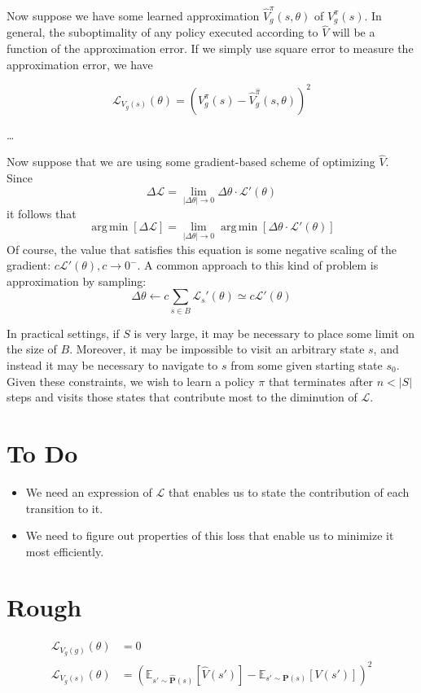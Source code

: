 \documentclass{article}
\DeclareMathOperator*{\argmin}{arg\,min}
\begin{document}
Now suppose we have some learned approximation $\hat{V}_{g}^\pi(s, \theta)$ of $V_{g}^\pi(s)$. In general, the suboptimality of any policy executed according to $\hat{V}$ will be a function of the approximation error. If we simply use square error to measure the approximation error, we have

\[
   \mathcal{L}_{V_g(s)}(\theta) = {({V_g^\pi(s) - \hat{V}_{g}^{\hat{\pi}}(s, \theta)})}^2
\]

\ldots 
\vspace{5mm}

Now suppose that we are using some gradient-based scheme of optimizing $\hat{V}$. Since 
\[
  \Delta \mathcal{L} = \lim_{|\Delta \theta| \to 0}\Delta \theta \cdot \mathcal{L}'(\theta)
\]
it follows that
\[
  \argmin \left[ \Delta \mathcal{L} \right] = \lim_{|\Delta \theta| \to 0}\argmin \left[ \Delta \theta \cdot \mathcal{L}'(\theta) \right]
\]
Of course, the value that satisfies this equation is some negative scaling of the gradient: $c\mathcal{L}'(\theta), c \to 0^-$. A common approach to this kind of problem is approximation by sampling:
\[
  \Delta \theta \leftarrow c\sum_{s \in B}\mathcal{L}_s'(\theta) \simeq c\mathcal{L}'(\theta)
\]

In practical settings, if $S$ is very large, it may be necessary to place some limit on the size of $B$. Moreover, it may be impossible to visit an arbitrary state $s$, and instead it may be necessary to navigate to $s$ from some given starting state $s_0$. Given these constraints, we wish to learn a policy $\pi$ that terminates after $n < |S|$ steps and visits those states that contribute most to the diminution of $\mathcal{L}$.

\section{To Do}
\begin{itemize}
\item We need an expression of $\mathcal{L}$ that enables us to state the contribution of each transition to it.
\item We need to figure out properties of this loss that enable us to minimize it most efficiently.
\end{itemize}

\section{Rough}

\begin{align}
   \mathcal{L}_{V_g(g)}(\theta) &= 0 \\
   \mathcal{L}_{V_g(s)}(\theta) &= {({\mathbb{E}_{s' \sim \bm{\hat{P}}(s)} {[{\hat{V}(s')}]}} - {\mathbb{E}_{s' \sim \bm{P}(s)} {[{V(s')}]}})}^2
 \end{align}
\end{document}
